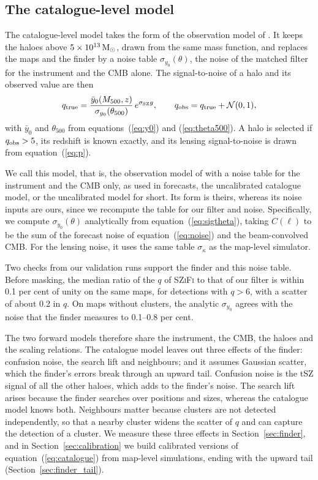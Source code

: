 \subsection{The catalogue-level model}\label{sec:sims:catalogue}

The catalogue-level model takes the form of the observation model of \citet{Zubeldia2025}. It keeps the
haloes above $5\times10^{13}\,\mathrm{M}_\odot$, drawn from the same mass function, and replaces the maps and the
finder by a noise table $\sigma_{y_0}(\theta)$, the noise of the matched filter for the instrument and the
CMB alone. The signal-to-noise of a halo and its observed value are then
\begin{equation}
q_\mathrm{true} = \frac{\bar y_0(M_{500},z)}{\sigma_{y_0}(\theta_{500})}\,e^{\sigma_\mathrm{SZ} g},\qquad
q_\mathrm{obs} = q_\mathrm{true} + \mathcal N(0,1),
\label{eq:catalogue}
\end{equation}
with $\bar y_0$ and $\theta_{500}$ from equations~(\ref{eq:y0}) and (\ref{eq:theta500}). A halo is
selected if $q_\mathrm{obs}>5$, its redshift is known exactly, and its lensing signal-to-noise is drawn from
equation~(\ref{eq:p}).

We call this model, that is, the observation model of \citet{Zubeldia2025} with a noise table for the
instrument and the CMB only, as used in forecasts, the uncalibrated catalogue model, or the uncalibrated
model for short. Its form is theirs, whereas its noise inputs are ours, since we recompute the table for our
filter and noise. Specifically, we compute $\sigma_{y_0}(\theta)$ analytically from equation~(\ref{eq:sigtheta}), taking
$C(\ell)$ to be the sum of the forecast noise of equation~(\ref{eq:noise}) and the beam-convolved CMB. For the lensing noise, it uses the same table $\sigma_\kappa$ as the map-level simulator.

Two checks from our validation runs support the finder and this noise table. Before masking, the median ratio of the $q$ of \textsc{SZiFi} to that of our filter is within 0.1 per cent of unity on the same maps, for detections with $q>6$, with a scatter of about 0.2 in $q$. On maps without clusters, the analytic $\sigma_{y_0}$ agrees with the noise that the
finder measures to 0.1--0.8 per cent.

The two forward models therefore share the instrument, the CMB, the haloes and the scaling relations. The
catalogue model leaves out three effects of the finder: confusion noise, the search lift and neighbours;
and it assumes Gaussian scatter, which the finder's errors break through an upward tail. Confusion noise is
the tSZ signal of all the other haloes, which adds to the finder's noise. The search lift arises because
the finder searches over positions and sizes, whereas the catalogue model knows both. Neighbours matter
because clusters are not detected independently, so that a nearby cluster widens the scatter of $q$ and
can capture the detection of a cluster. We measure these three effects in Section~\ref{sec:finder}, and in
Section~\ref{sec:calibration} we build calibrated versions of equation~(\ref{eq:catalogue}) from map-level
simulations, ending with the upward tail (Section~\ref{sec:finder_tail}).

